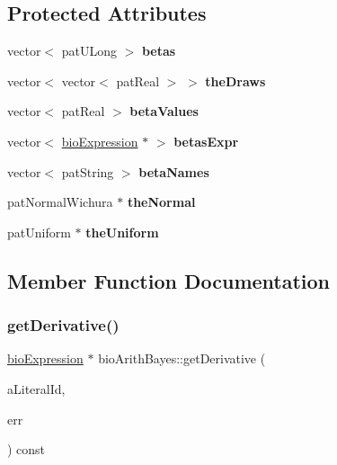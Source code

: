 \subsection*{Protected Attributes}
\begin{DoxyCompactItemize}
\item 
\mbox{\label{classbio_arith_bayes_acc12626e93cfc2284925324481e4e5e3}} 
vector$<$ pat\+U\+Long $>$ {\bfseries betas}
\item 
\mbox{\label{classbio_arith_bayes_a919e7b640febedf38f99ea9e1b1bce9d}} 
vector$<$ vector$<$ pat\+Real $>$ $>$ {\bfseries the\+Draws}
\item 
\mbox{\label{classbio_arith_bayes_af1a8a772dac8eac243a2813b3fbd378b}} 
vector$<$ pat\+Real $>$ {\bfseries beta\+Values}
\item 
\mbox{\label{classbio_arith_bayes_a967ec67d4d7ea0905b64905e8f81ea33}} 
vector$<$ \hyperlink{classbio_expression}{bio\+Expression} $\ast$ $>$ {\bfseries betas\+Expr}
\item 
\mbox{\label{classbio_arith_bayes_ab549c547068e12f61da48efd39391195}} 
vector$<$ pat\+String $>$ {\bfseries beta\+Names}
\item 
\mbox{\label{classbio_arith_bayes_ad87851021a53ac4dabe7194d1ec7370d}} 
pat\+Normal\+Wichura $\ast$ {\bfseries the\+Normal}
\item 
\mbox{\label{classbio_arith_bayes_a7ad02ee9a4b5d6515c4523f8cc62bd78}} 
pat\+Uniform $\ast$ {\bfseries the\+Uniform}
\end{DoxyCompactItemize}


\subsection{Member Function Documentation}
\mbox{\label{classbio_arith_bayes_a53f5d22f6a5b743fbf50bd75db697ccd}} 
\subsubsection{\texorpdfstring{get\+Derivative()}{getDerivative()}}
{\footnotesize\ttfamily \hyperlink{classbio_expression}{bio\+Expression} $\ast$ bio\+Arith\+Bayes\+::get\+Derivative (\begin{DoxyParamCaption}\item[{pat\+U\+Long}]{a\+Literal\+Id,  }\item[{pat\+Error $\ast$\&}]{err }\end{DoxyParamCaption}) const\hspace{0.3cm}{\ttfamily [virtual]}}

